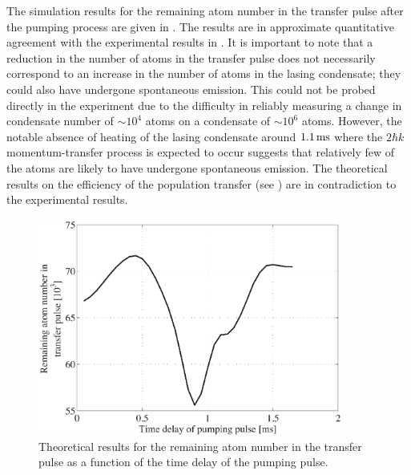 The simulation results for the remaining atom number in the transfer pulse after the pumping process are given in .  The results are in approximate quantitative agreement with the experimental results in .  It is important to note that a reduction in the number of atoms in the transfer pulse does not necessarily correspond to an increase in the number of atoms in the lasing condensate; they could also have undergone spontaneous emission.  This could not be probed directly in the experiment due to the difficulty in reliably measuring a change in condensate number of $\sim 10^4$ atoms on a condensate of $\sim 10^6$ atoms.  However, the notable absence of heating of the lasing condensate around $\unit[1.1]{ms}$ where the $2 \hbar k$ momentum-transfer process is expected to occur suggests that relatively few of the atoms are likely to have undergone spontaneous emission.  The theoretical results on the efficiency of the population transfer (see ) are in contradiction to the experimental results.

\begin{figure}
    \centering
    \includegraphics[width=10cm]{PulsedPumpingTheoryTransferPulseNumber}
    \caption{Theoretical results for the remaining atom number in the transfer pulse as a function of the time delay of the pumping pulse.}
    \label{OpticalPumping:PulsedPumpingTheoryTransferPulseNumber}
\end{figure}

